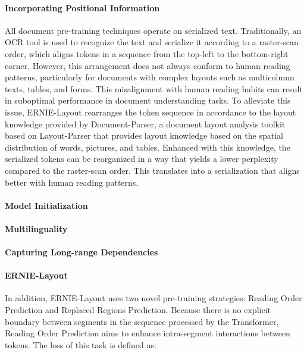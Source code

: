 \paragraph{Incorporating Positional Information}

All document pre-training techniques operate on serialized text. Traditionally, an OCR tool is used to recognize the text and serialize it according to a raster-scan order, which aligns tokens in a sequence from the top-left to the bottom-right corner. However, this arrangement does not always conform to human reading patterns, particularly for documents with complex layouts such as multicolumn texts, tables, and forms. This misalignment with human reading habits can result in suboptimal performance in document understanding tasks. To alleviate this issue, ERNIE-Layout \citep{peng2022ernie} rearranges the token sequence in accordance to the layout knowledge provided by Document-Parser, a document layout analysis toolkit based on Layout-Parser \citep{shen2021layoutparser} that provides layout knowledge based on the spatial distribution of words, pictures, and tables. Enhanced with this knowledge, the serialized tokens can be reorganized in a way that yields a lower perplexity compared to the raster-scan order. This translates into a serialization that aligns better with human reading patterns. 

\paragraph{Model Initialization}

\paragraph{Multilinguality}

\paragraph{Capturing Long-range Dependencies}


\paragraph{ERNIE-Layout}

In addition, ERNIE-Layout uses two novel pre-training strategies: Reading Order Prediction and Replaced Regions Prediction. Because there is no explicit boundary between segments in the sequence processed by the Transformer, Reading Order Prediction aims to enhance intra-segment interactions between tokens. The loss of this task is defined as:

